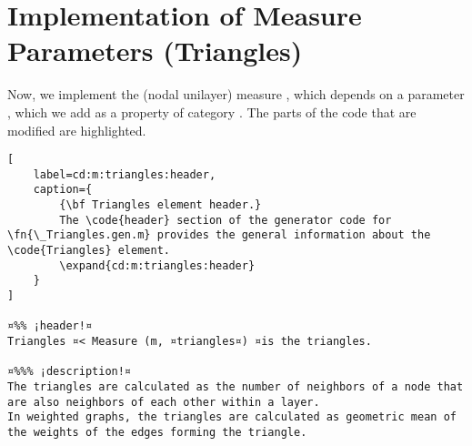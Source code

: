 \documentclass{tufte-handout}
\begin{document}
\clearpage
\section{Implementation of Measure Parameters (Triangles)}

Now, we implement the (nodal unilayer) measure , which depends on a parameter , which we add as a property of category .
The parts of the code that are modified are highlighted.

\begin{lstlisting}[
	label=cd:m:triangles:header,
	caption={
		{\bf Triangles element header.}
		The \code{header} section of the generator code for \fn{\_Triangles.gen.m} provides the general information about the \code{Triangles} element.
		\expand{cd:m:triangles:header}
	}
]

¤%% ¡header!¤
Triangles ¤< Measure (m, ¤triangles¤) ¤is the triangles.

¤%%% ¡description!¤
The triangles are calculated as the number of neighbors of a node that are also neighbors of each other within a layer. 
In weighted graphs, the triangles are calculated as geometric mean of the weights of the edges forming the triangle.
\end{lstlisting}
\end{document}
